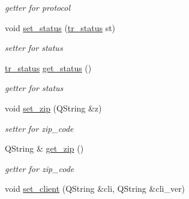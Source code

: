 \begin{CompactItemize}
\begin{CompactList}\small\item\em getter for protocol \item\end{CompactList}\item 
\hypertarget{classTraceroute_bdd1d059d026b243a41e85f2afc4dbbf}{
void \hyperlink{classTraceroute_bdd1d059d026b243a41e85f2afc4dbbf}{set\_\-status} (\hyperlink{classTraceroute_dfccd360ace7950ed27e03705742fdc2}{tr\_\-status} st)}
\label{classTraceroute_bdd1d059d026b243a41e85f2afc4dbbf}

\begin{CompactList}\small\item\em setter for status \item\end{CompactList}\item 
\hypertarget{classTraceroute_5175f96842f2561ab9e6c946467a208c}{
\hyperlink{classTraceroute_dfccd360ace7950ed27e03705742fdc2}{tr\_\-status} \hyperlink{classTraceroute_5175f96842f2561ab9e6c946467a208c}{get\_\-status} ()}
\label{classTraceroute_5175f96842f2561ab9e6c946467a208c}

\begin{CompactList}\small\item\em getter for status \item\end{CompactList}\item 
\hypertarget{classTraceroute_378355f12fec497ff2af13050cea53f3}{
void \hyperlink{classTraceroute_378355f12fec497ff2af13050cea53f3}{set\_\-zip} (QString \&z)}
\label{classTraceroute_378355f12fec497ff2af13050cea53f3}

\begin{CompactList}\small\item\em setter for zip\_\-code \item\end{CompactList}\item 
\hypertarget{classTraceroute_97d83c076bd2d4c2ebfdf31cb8573909}{
QString \& \hyperlink{classTraceroute_97d83c076bd2d4c2ebfdf31cb8573909}{get\_\-zip} ()}
\label{classTraceroute_97d83c076bd2d4c2ebfdf31cb8573909}

\begin{CompactList}\small\item\em getter for zip\_\-code \item\end{CompactList}\item 
\hypertarget{classTraceroute_9289b3edce201b193c06b3dd775edeb9}{
void \hyperlink{classTraceroute_9289b3edce201b193c06b3dd775edeb9}{set\_\-client} (QString \&cli, QString \&cli\_\-ver)}
\label{classTraceroute_9289b3edce201b193c06b3dd775edeb9}


\end{CompactItemize}
